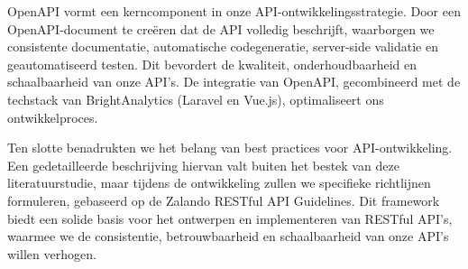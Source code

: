 \bigskip

OpenAPI vormt een kerncomponent in onze API-ontwikkelingsstrategie. Door een OpenAPI-document te creëren dat de API volledig beschrijft, waarborgen we consistente documentatie, automatische codegeneratie, server-side validatie en geautomatiseerd testen. Dit bevordert de kwaliteit, onderhoudbaarheid en schaalbaarheid van onze API's. De integratie van OpenAPI, gecombineerd met de techstack van BrightAnalytics (Laravel en Vue.js), optimaliseert ons ontwikkelproces.

\bigskip

Ten slotte benadrukten we het belang van best practices voor API-ontwikkeling. Een gedetailleerde beschrijving hiervan valt buiten het bestek van deze literatuurstudie, maar tijdens de ontwikkeling zullen we specifieke richtlijnen formuleren, gebaseerd op de Zalando RESTful API Guidelines. Dit framework biedt een solide basis voor het ontwerpen en implementeren van RESTful API's, waarmee we de consistentie, betrouwbaarheid en schaalbaarheid van onze API's willen verhogen.
